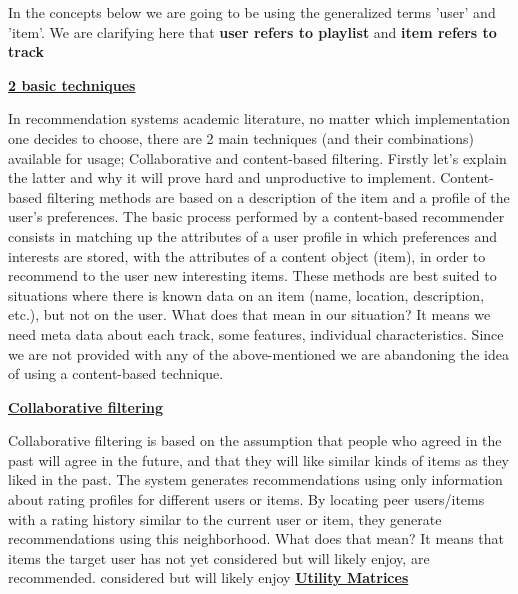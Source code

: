 \documentclass[]{article}
\begin{document}
In the concepts below we are going to be using the generalized terms 'user' and 'item'. We are clarifying here that \textbf{user refers to playlist} and \textbf{item refers to track}
\begin{center}
	\Large\textbf{\underline{2 basic techniques}}
	
	In recommendation systems academic literature, no matter which implementation one decides to choose, there are 2 main techniques (and their combinations) available for usage; Collaborative and content-based filtering. Firstly let's explain the latter and why it will prove hard and unproductive to implement. Content-based filtering methods are based on a description of the item and a profile of the user's preferences. The basic process performed by a content-based recommender consists in matching up the attributes of a user profile in which preferences
	and interests are stored, with the attributes of a content object (item), in order to
	recommend to the user new interesting items. \cite{2} These methods are best suited to situations where there is known data on an item (name, location, description, etc.), but not on the user. What does that mean in our situation? It means we need meta data about each track, some features, individual characteristics. Since we are not provided with any of the above-mentioned we are abandoning the idea of using a content-based technique.
	
	\textbf{\underline{Collaborative filtering}}
	
	Collaborative filtering is based on the assumption that people who agreed in the past will agree in the future, and that they will like similar kinds of items as they liked in the past. The system generates recommendations using only information about rating profiles for different users or items. By locating peer users/items with a rating history similar to the current user or item, they generate recommendations using this neighborhood. What does that mean? It means that items the target user has not yet considered but will likely enjoy, are recommended. \cite{3}
	considered but will likely enjoy 
	\textbf{\underline{Utility Matrices}}
	

\end{center}
\end{document}
